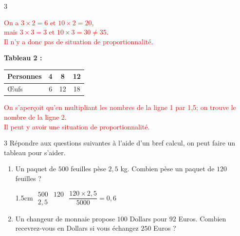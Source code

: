 \documentclass[a4paper]{book}
\begin{document}
{\begin{exerciceNote}{3}
\begin{minipage}{0.45\linewidth}
            \textcolor{red}{On a  $3\times2=6$ et $10\times2=20$, \\
            mais $3\times3=3$ et $10\times3=30\neq35$. \\
            Il n'y a donc pas de situation de proportionnalité.}
        \end{minipage}
        \hfill\vline\hfill
        \begin{minipage}{0.45\linewidth}
            \begin{center}
                \textbf{Tableau 2 :} \begin{tabular}{|l|c|c|c|} 
                \hline Personnes & 4 & 8 & 12 \\ 
                \hline Œufs & 6 & 12 & 18 \\ \hline 
                \end{tabular}
            \end{center}

            \medskip
            
            \textcolor{red}{On s’aperçoit qu'en multipliant les nombres de la ligne 1 par 1,5; on trouve le nombre de la ligne 2.\\
            Il peut y avoir une situation de proportionnalité.}
        \end{minipage}      
    \end{exerciceNote}
    

\newpage


    \begin{exerciceNote}{3}
        Répondre aux questions suivantes à l'aide d'un bref calcul, on peut faire un tableau pour s'aider.

        \begin{enumerate}[leftmargin=*]
            \item Un paquet de $500$ feuilles pèse $2,5$ kg. Combien pèse un paquet de $120$ feuilles ?

            \begin{ZoneReponse}{1.5cm}  
                $\begin{array}{c|c}
                     500 & 120 \\ \hline
                     2,5 & 
                \end{array}$ \quad 
                $\dfrac{120\times2,5}{5000}=0,6$
            \end{ZoneReponse}

            \item Un changeur de monnaie propose $100$ Dollars pour $92$ Euros. Combien recevrez-vous en Dollars si vous échangez $250$ Euros ?


\end{enumerate}
\end{exerciceNote}}
\end{document}
